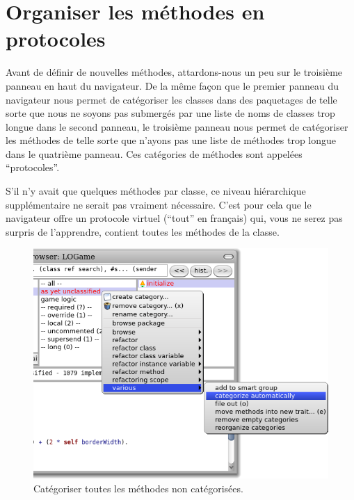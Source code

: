 \documentclass[a4paper,10pt,twoside]{book}
\begin{document}

\section{Organiser les méthodes en protocoles}

Avant de définir de nouvelles méthodes, attardons-nous un peu sur le 
troisième panneau en haut du navigateur.
De la même façon que le premier panneau du navigateur nous permet de
catégoriser les classes dans des paquetages de telle sorte
que nous ne soyons pas submergés par une liste de noms de classes trop
longue dans le second panneau, le troisième panneau nous permet de
catégoriser les méthodes de telle sorte que n'ayons pas une liste de
méthodes trop longue dans le quatrième panneau.
Ces catégories de méthodes sont appelées ``protocoles''.

S'il n'y avait que quelques méthodes par classe, ce niveau hiérarchique supplémentaire ne serait pas vraiment nécessaire.
C'est pour cela que le navigateur offre un protocole virtuel
 (\cad ``tout'' en français) qui, vous ne serez pas surpris de l'apprendre, contient toutes les méthodes de la classe.

\begin{figure}[htbp]
   \centering
   \includegraphics[width=\textwidth]{Categorize} 
   \caption{Catégoriser  toutes les méthodes
     non catégorisées.}
\end{figure}
\end{document}
